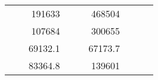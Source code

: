 \begin{table}[H]
\begin{tabular}{|ccrccrccc}
\multicolumn{1}{|c|}{\cellcolor[HTML]{FFFFC7}}                                & \multicolumn{1}{c|}{\cellcolor[HTML]{DDFDFF}}                      & \multicolumn{1}{r|}{\cellcolor[HTML]{DAE8FC}191633}    & \multicolumn{1}{c|}{\cellcolor[HTML]{FFFFC7}}                                & \multicolumn{1}{c|}{\cellcolor[HTML]{DDFDFF}}                       & \multicolumn{1}{r|}{\cellcolor[HTML]{DDFDFF}468504}    &                                                                              &                                                                    &                                                        \\ \cline{3-3} \cline{6-6}
\multicolumn{1}{|c|}{\cellcolor[HTML]{FFFFC7}}                                & \multicolumn{1}{c|}{\cellcolor[HTML]{DDFDFF}}                      & \multicolumn{1}{r|}{\cellcolor[HTML]{DDFDFF}107684}    & \multicolumn{1}{c|}{\cellcolor[HTML]{FFFFC7}}                                & \multicolumn{1}{c|}{\cellcolor[HTML]{DDFDFF}}                       & \multicolumn{1}{r|}{\cellcolor[HTML]{DAE8FC}300655}    &                                                                              &                                                                    &                                                        \\ \cline{3-3} \cline{6-6}
\multicolumn{1}{|c|}{\cellcolor[HTML]{FFFFC7}}                                & \multicolumn{1}{c|}{\cellcolor[HTML]{DDFDFF}}                      & \multicolumn{1}{r|}{\cellcolor[HTML]{DAE8FC}69132.1}   & \multicolumn{1}{c|}{\cellcolor[HTML]{FFFFC7}}                                & \multicolumn{1}{c|}{\cellcolor[HTML]{DDFDFF}}                       & \multicolumn{1}{r|}{\cellcolor[HTML]{DDFDFF}67173.7}   &                                                                              &                                                                    &                                                        \\ \cline{3-3} \cline{6-6}
\multicolumn{1}{|c|}{\cellcolor[HTML]{FFFFC7}}                                & \multicolumn{1}{c|}{\cellcolor[HTML]{DDFDFF}}                      & \multicolumn{1}{r|}{\cellcolor[HTML]{DDFDFF}83364.8}   & \multicolumn{1}{c|}{\cellcolor[HTML]{FFFFC7}}                                & \multicolumn{1}{c|}{\cellcolor[HTML]{DDFDFF}}                       & \multicolumn{1}{r|}{\cellcolor[HTML]{DAE8FC}139601}    &                                                                              &                                                                    &                                                        \\ \cline{3-3} \cline{6-6}

\end{tabular}
\end{table}
